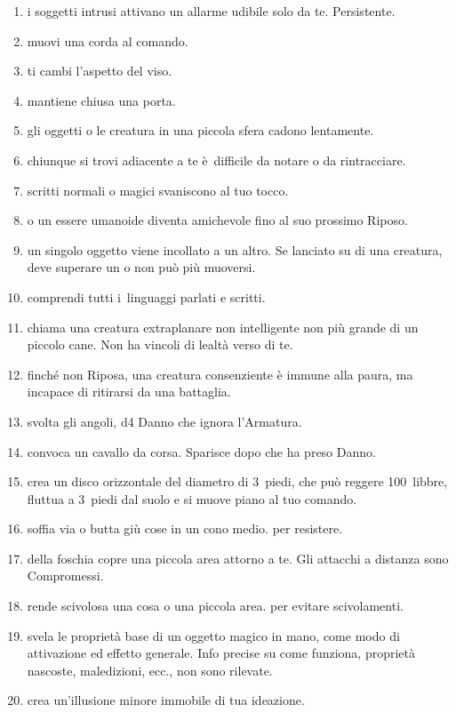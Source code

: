\documentclass[itdr]{subfiles}
\begin{document}
\begin{enumerate}
	\item {} i soggetti intrusi attivano un allarme udibile solo da te. Persistente.
	\item {} muovi una corda al comando.
	\item {} ti cambi l’aspetto del viso.
	\item {} mantiene chiusa una porta.
	\item {} gli oggetti o le creatura in una piccola sfera cadono lentamente.
	\item {} chiunque si trovi adiacente a te è~difficile da notare o da rintracciare.
	\item {} scritti normali o magici svaniscono al tuo tocco.
	\item {}  o un essere umanoide diventa amichevole fino al suo prossimo Riposo.
	\item {} un singolo oggetto viene incollato a un altro. Se lanciato su di una creatura, deve superare un  o non può più muoversi.
	\item {} comprendi tutti i~linguaggi parlati e scritti.
	\item {} chiama una creatura extraplanare non intelligente non più grande di un piccolo cane. Non ha vincoli di lealtà verso di te.
	\item {} finché non Riposa, una creatura consenziente è immune alla paura, ma incapace di ritirarsi da una battaglia.
	\item {} svolta gli angoli, d4 Danno che ignora l’Armatura.
	\item {} convoca un cavallo da corsa. Sparisce dopo che ha preso Danno.
	\item {} crea un disco orizzontale del diametro di 3~piedi, che può reggere 100~libbre, fluttua a 3~piedi dal suolo e si muove piano al tuo comando.
	\item {} soffia via o butta giù cose in un cono medio.  per resistere.
	\item {} della foschia copre una piccola area attorno a te. Gli attacchi a distanza sono Compromessi.
	\item {} rende scivolosa una cosa o una piccola area.  per evitare scivolamenti.
	\item {} svela le proprietà base di un oggetto magico in mano, come modo di attivazione ed effetto generale. Info precise su come funziona, proprietà nascoste, maledizioni, ecc., non sono rilevate.
	\item {} crea un’\mbox{illusione} minore immobile di tua ideazione.
	

\end{enumerate}
\end{document}
